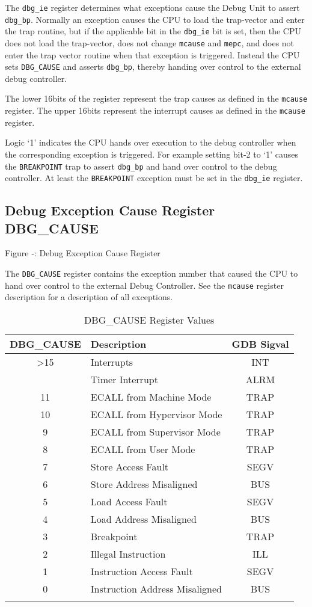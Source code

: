 The \texttt{dbg\_ie} register determines what exceptions cause the Debug Unit to
assert \texttt{dbg\_bp}. Normally an exception causes the CPU to load the
trap-vector and enter the trap routine, but if the applicable bit in the
\texttt{dbg\_ie} bit is set, then the CPU does not load the trap-vector, does not
change \texttt{mcause} and \texttt{mepc}, and does not enter the trap vector routine when
that exception is triggered. Instead the CPU sets \texttt{DBG\_CAUSE} and asserts
\texttt{dbg\_bp}, thereby handing over control to the external debug controller.

The lower 16bits of the register represent the trap causes as defined in
the \texttt{mcause} register. The upper 16bits represent the interrupt causes as
defined in the \texttt{mcause} register.

Logic `1' indicates the CPU hands over execution to the debug controller
when the corresponding exception is triggered. For example setting bit-2
to `1' causes the \texttt{BREAKPOINT} trap to assert \texttt{dbg\_bp} and hand over
control to the debug controller. At least the \texttt{BREAKPOINT} exception must
be set in the \texttt{dbg\_ie} register.

\subsection{Debug Exception Cause Register
DBG\_CAUSE}\label{debug-exception-cause-register-dbg_cause}

\missingfigure{}

Figure ‑: Debug Exception Cause Register

The \texttt{DBG\_CAUSE} register contains the exception number that caused the
CPU to hand over control to the external Debug Controller. See the
\texttt{mcause} register description for a description of all exceptions.

\begin{longtable}[]{@{}clc@{}}
\toprule
\textbf{DBG\_CAUSE} & \textbf{Description} & \textbf{GDB Sigval}\tabularnewline
\midrule
\endhead
\textgreater{}15 & Interrupts & INT\tabularnewline
& Timer Interrupt & ALRM\tabularnewline
11 & ECALL from Machine Mode & TRAP\tabularnewline
10 & ECALL from Hypervisor Mode & TRAP\tabularnewline
9 & ECALL from Supervisor Mode & TRAP\tabularnewline
8 & ECALL from User Mode & TRAP\tabularnewline
7 & Store Access Fault & SEGV\tabularnewline
6 & Store Address Misaligned & BUS\tabularnewline
5 & Load Access Fault & SEGV\tabularnewline
4 & Load Address Misaligned & BUS\tabularnewline
3 & Breakpoint & TRAP\tabularnewline
2 & Illegal Instruction & ILL\tabularnewline
1 & Instruction Access Fault & SEGV\tabularnewline
0 & Instruction Address Misaligned & BUS\tabularnewline
\bottomrule
\caption{DBG\_CAUSE Register Values}
\end{longtable}

